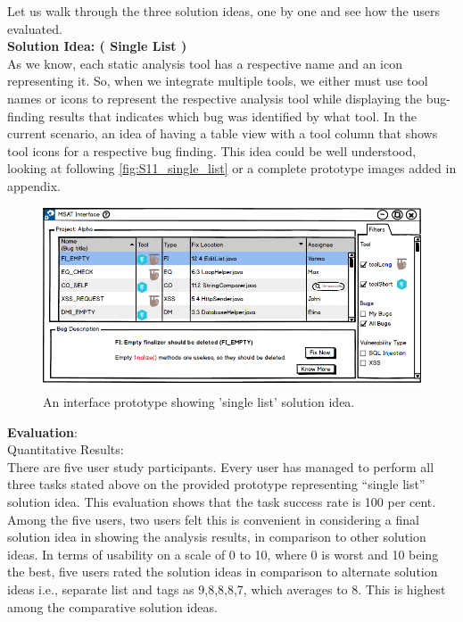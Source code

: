 Let us walk through the three solution ideas, one by one and see how the users evaluated. \\

\textbf{Solution Idea: ( Single List )} \\

As we know, each static analysis tool has a respective name and an icon representing it. So, when we integrate multiple tools, we either must use tool names or icons to represent the respective analysis tool while displaying the bug-finding results that indicates which bug was identified by what tool. In the current scenario, an idea of having a table view with a tool column that shows tool icons for a respective bug finding. This idea could be well understood, looking at following \autoref{fig:S11_single_list} or a complete prototype images added in appendix. \\

\begin{figure}[hbt!]
	\centering
	\includegraphics[width=\linewidth]{figures/solution_ideas_snaps/S11_single_list}
	\caption{An interface prototype showing 'single list' solution idea.}
	\label{fig:S11_single_list}
\end{figure}


\textbf{Evaluation}: \\

Quantitative Results: \\

There are five user study participants. Every user has managed to perform all three tasks stated above on the provided prototype representing “single list” solution idea. This evaluation shows that the task success rate is 100 per cent. \\

Among the five users, two users felt this is convenient in considering a final solution idea in showing the analysis results, in comparison to other solution ideas.  In terms of usability on a scale of 0 to 10, where 0 is worst and 10 being the best, five users rated the solution ideas in comparison to alternate solution ideas i.e., separate list and tags as 9,8,8,8,7, which averages to 8. This is highest among the comparative solution ideas. \\

